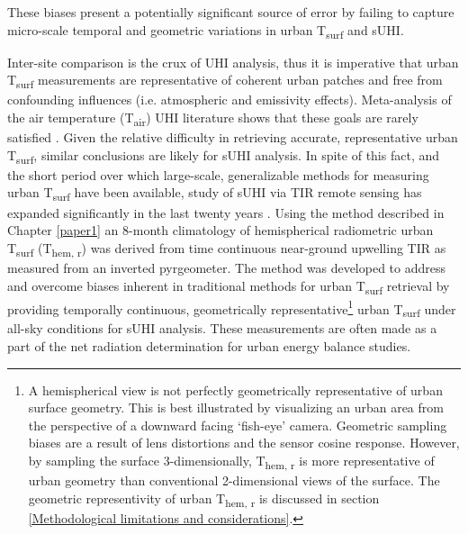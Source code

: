 \begin{bibunit}
\noindent These biases present a potentially significant source of error by failing to capture micro-scale temporal and geometric variations in urban T\textsubscript{surf} and sUHI. 

Inter-site comparison is the crux of UHI analysis, thus it is imperative that urban T\textsubscript{surf} measurements are representative of coherent urban patches and free from confounding influences (i.e. atmospheric and emissivity effects). Meta-analysis of the air temperature (T\textsubscript{air}) UHI literature shows that these goals are rarely satisfied \citep{Stewart2011}. Given the relative difficulty in retrieving accurate, representative urban T\textsubscript{surf}, similar conclusions are likely for sUHI analysis. In spite of this fact, and the short period over which large-scale, generalizable methods for measuring urban T\textsubscript{surf} have been available, study of sUHI via TIR remote sensing has expanded significantly in the last twenty years \citep{Peng2012,Voogt2003}. Using the method described in Chapter \ref{paper1} an 8-month climatology of hemispherical radiometric urban T\textsubscript{surf} (T\textsubscript{hem, r}) was derived from time continuous near-ground upwelling TIR as measured from an inverted pyrgeometer. The method was developed to address and overcome biases inherent in traditional methods for urban T\textsubscript{surf} retrieval by providing temporally continuous, geometrically representative\footnote{A hemispherical view is not perfectly geometrically representative of urban surface geometry. This is best illustrated by visualizing an urban area from the perspective of a downward facing ‘fish-eye’ camera. Geometric sampling biases are a result of lens distortions and the sensor cosine response. However, by sampling the surface 3-dimensionally, T\textsubscript{hem, r} is more representative of urban geometry than conventional 2-dimensional views of the surface. The geometric representivity of urban T\textsubscript{hem, r} is discussed in section \ref{Methodological limitations and considerations}.} urban T\textsubscript{surf} under all-sky conditions for sUHI analysis. These measurements are often made as a part of the net radiation determination for urban energy balance studies.


\end{bibunit}

